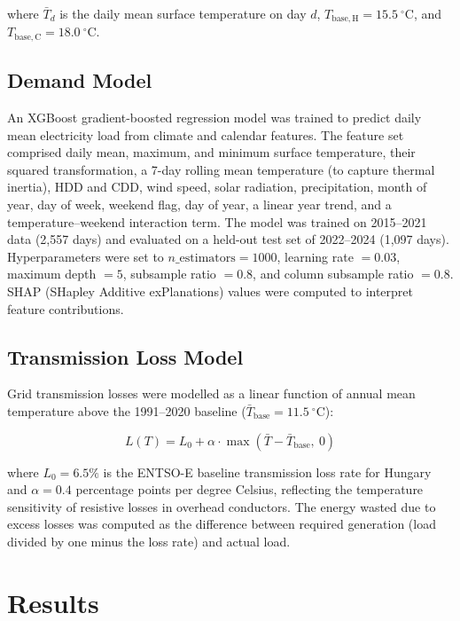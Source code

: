 \documentclass[11pt,a4paper]{article}
\begin{document}
where $\bar{T}_d$ is the daily mean surface temperature on day $d$,
$T_\mathrm{base,H} = 15.5~^\circ$C, and $T_\mathrm{base,C} = 18.0~^\circ$C.

\subsection{Demand Model}
\label{sec:methods_model}

An XGBoost gradient-boosted regression model \citep{chen2016xgboost}
was trained to predict daily mean electricity load from climate and
calendar features. The feature set comprised daily mean, maximum, and
minimum surface temperature, their squared transformation, a 7-day
rolling mean temperature (to capture thermal inertia), HDD and CDD,
wind speed, solar radiation, precipitation, month of year, day of week,
weekend flag, day of year, a linear year trend, and a
temperature--weekend interaction term. The model was trained on
2015--2021 data (2,557 days) and evaluated on a held-out test set
of 2022--2024 (1,097 days). Hyperparameters were set to
$n\_\mathrm{estimators} = 1000$, learning rate $= 0.03$,
maximum depth $= 5$, subsample ratio $= 0.8$, and column subsample
ratio $= 0.8$. SHAP (SHapley Additive exPlanations) values were
computed to interpret feature contributions.

\subsection{Transmission Loss Model}
\label{sec:methods_losses}

Grid transmission losses were modelled as a linear function of
annual mean temperature above the 1991--2020 baseline
($\bar{T}_\mathrm{base} = 11.5~^\circ$C):

\begin{equation}
  L(T) = L_0 + \alpha \cdot \max(\bar{T} - \bar{T}_\mathrm{base},\ 0)
  \label{eq:loss}
\end{equation}

where $L_0 = 6.5\%$ is the ENTSO-E baseline transmission loss rate
for Hungary \citep{entsoe} and $\alpha = 0.4$ percentage points per
degree Celsius, reflecting the temperature sensitivity of resistive
losses in overhead conductors. The energy wasted due to excess
losses was computed as the difference between required generation
(load divided by one minus the loss rate) and actual load.

\section{Results}
\label{sec:results}
\end{document}
